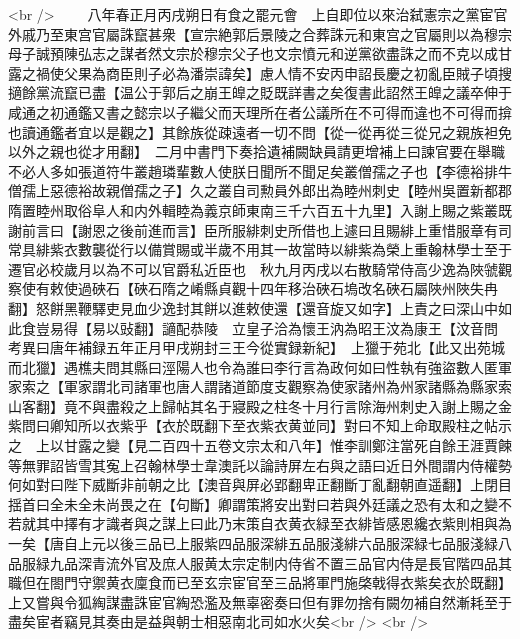 <br />
　　八年春正月丙戌朔日有食之罷元會　上自即位以來治弑憲宗之黨宦官外戚乃至東宫官屬誅竄甚衆【宣宗絶郭后景陵之合葬誅元和東宫之官屬則以為穆宗母子誠預陳弘志之謀者然文宗於穆宗父子也文宗憤元和逆黨欲盡誅之而不克以成甘露之禍使父果為商臣則子必為潘崇諱矣】慮人情不安丙申詔長慶之初亂臣賊子頃搜擿餘黨流竄已盡【温公于郭后之崩王皥之貶既詳書之矣復書此詔然王皥之議卒伸于咸通之初通鑑又書之懿宗以子繼父而天理所在者公議所在不可得而違也不可得而揜也讀通鑑者宜以是觀之】其餘族從疎遠者一切不問【從一從再從三從兄之親族袒免以外之親也從才用翻】　二月中書門下奏拾遺補闕缺員請更增補上曰諫官要在舉職不必人多如張道符牛叢趙璘輩數人使朕日聞所不聞足矣叢僧孺之子也【李德裕排牛僧孺上惡德裕故親僧孺之子】久之叢自司勲員外郎出為睦州刺史【睦州吳置新都郡隋置睦州取俗阜人和内外輯睦為義京師東南三千六百五十九里】入謝上賜之紫叢既謝前言曰【謝恩之後前進而言】臣所服緋刺史所借也上遽曰且賜緋上重惜服章有司常具緋紫衣數襲從行以備賞賜或半歲不用其一故當時以緋紫為榮上重翰林學士至于遷官必校歲月以為不可以官爵私近臣也　秋九月丙戌以右散騎常侍高少逸為陜虢觀察使有敕使過硤石【硤石隋之崤縣貞觀十四年移治硤石塢改名硤石屬陜州陜失冉翻】怒餅黑鞭驛吏見血少逸封其餅以進敕使還【還音旋又如字】上責之曰深山中如此食豈易得【易以䜴翻】讁配恭陵　立皇子洽為懷王汭為昭王汶為康王【汶音問　考異曰唐年補録五年正月甲戌朔封三王今從實録新紀】　上獵于苑北【此又出苑城而北獵】遇樵夫問其縣曰涇陽人也令為誰曰李行言為政何如曰性執有強盜數人匿軍家索之【軍家謂北司諸軍也唐人謂諸道節度支觀察為使家諸州為州家諸縣為縣家索山客翻】竟不與盡殺之上歸帖其名于寢殿之柱冬十月行言除海州刺史入謝上賜之金紫問曰卿知所以衣紫乎【衣於既翻下至衣紫衣黄並同】對曰不知上命取殿柱之帖示之　上以甘露之變【見二百四十五卷文宗太和八年】惟李訓鄭注當死自餘王涯賈餗等無罪詔皆雪其寃上召翰林學士韋澳託以論詩屏左右與之語曰近日外間謂内侍權勢何如對曰陛下威斷非前朝之比【澳音與屏必郢翻卑正翻斷丁亂翻朝直遥翻】上閉目揺首曰全未全未尚畏之在【句斷】卿謂策將安出對曰若與外廷議之恐有太和之變不若就其中擇有才識者與之謀上曰此乃末策自衣黄衣緑至衣緋皆感恩纔衣紫則相與為一矣【唐自上元以後三品已上服紫四品服深緋五品服淺緋六品服深緑七品服淺緑八品服緑九品深青流外官及庶人服黄太宗定制内侍省不置三品官内侍是長官階四品其職但在閤門守禦黄衣廩食而已至玄宗宦官至三品將軍門施棨戟得衣紫矣衣於既翻】上又嘗與令狐綯謀盡誅宦官綯恐濫及無辜密奏曰但有罪勿捨有闕勿補自然漸耗至于盡矣宦者竊見其奏由是益與朝士相惡南北司如水火矣<br />
<br />
